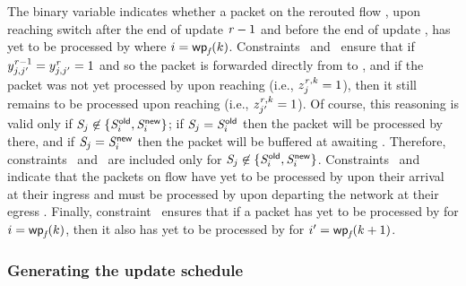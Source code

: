 The binary variable \todoNF{\updateIdx}{\wpIdx}{\switchIdx} indicates
whether a packet on the rerouted flow \flowID{}, upon reaching switch
\switchIdx after the end of update $\mathit{r}-1$ and before the end
of update \updateIdx, has yet to be processed by \nfID{\nfIdx} where
$\nfIdx = \wpFn{\flowID{}}{\wpIdx}$.
Constraints~
and~ ensure that if
$y^{\mathit{r}-1}_{{j},{j'}} =
y^{\mathit{r}}_{{j},{j'}} = 1$ and so the
packet is forwarded directly from \switchID{\switchIdx} to
\switchID{\switchIdxAlt}, and if the packet was not yet processed by
\nfID{\nfIdx} upon reaching \switchID{\switchIdx} (i.e.,
$z^{{\mathit{r}},{k}}_{j} = 1$), then it still remains
to be processed upon reaching \switchID{\switchIdxAlt} (i.e.,
$z^{{\mathit{r}},{k}}_{j'} = 1$).  Of course, this
reasoning is valid only if $\switchID{\switchIdx} \not\in
\{\oldSwitchID{\nfIdx}, \newSwitchID{\nfIdx}\}$; if
$\switchID{\switchIdx} = \oldSwitchID{\nfIdx}$ then the packet will be
processed by \nfID{\nfIdx} there, and if $\switchID{\switchIdx} =
\newSwitchID{\nfIdx}$ then the packet will be buffered at
\switchID{\switchIdx} awaiting \nfID{\nfIdx}.  Therefore,
constraints~
and~ are included only for
$\switchID{\switchIdx} \not\in \{\oldSwitchID{\nfIdx},
\newSwitchID{\nfIdx}\}$.  Constraints~
and~ indicate that the packets on flow
\flowID{} have yet to be processed by \nfID{\nfIdx} upon their arrival
at their ingress \inSwitch{\flowID{}} and must be processed by
\nfID{\nfIdx} upon departing the network at their egress
\outSwitch{\flowID{}}.  Finally, constraint~
ensures that if a packet has yet to be processed by \nfID{\nfIdx} for
$\nfIdx = \wpFn{\flowID{}}{\wpIdx}$, then it also has yet to be
processed by \nfID{\nfIdxAlt} for $\nfIdxAlt =
\wpFn{\flowID{}}{\wpIdx+1}$.

\subsubsection{Generating the update schedule}
\label{sec:schedule:tsu:schedule}

